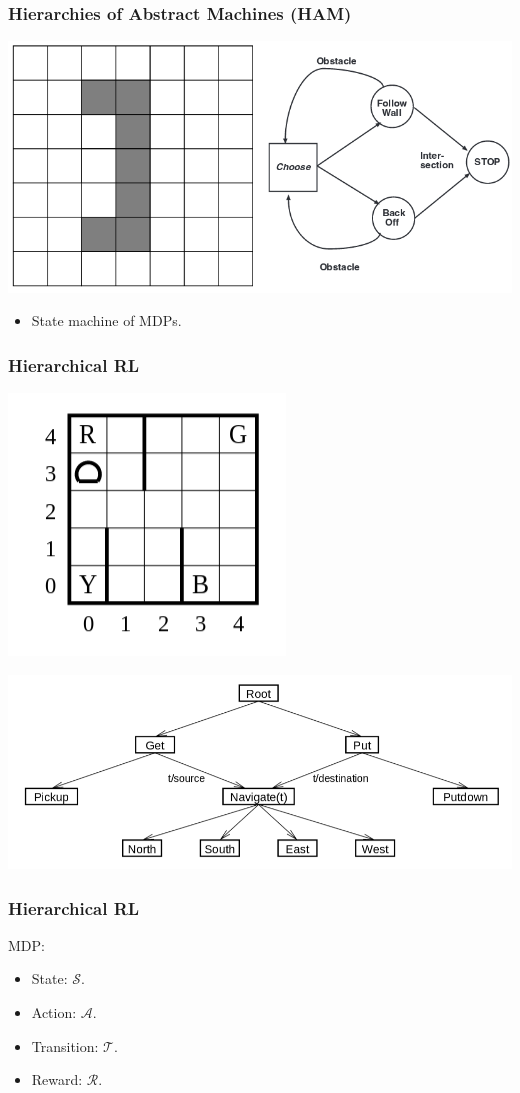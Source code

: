 \documentclass{beamer}
\begin{document}
\begin{frame}
\frametitle{Hierarchies of Abstract Machines (HAM)}
\includegraphics[width=0.8\columnwidth]{ham.png}
\begin{itemize}
  \item State machine of MDPs.
\end{itemize}
\end{frame}

\begin{frame}
\frametitle{Hierarchical RL}
\includegraphics[width=0.4\columnwidth]{taxi.png}

\includegraphics[width=0.8\columnwidth]{maxq.png}
\end{frame}

\begin{frame}
\frametitle{Hierarchical RL}
MDP:
\begin{itemize}
  \item State: {\color{red}$\mathcal{S}$}.
  \item Action: {\color{red}$\mathcal{A}$}.
  \item Transition: {\color{red}$\mathcal{T}$}.
  \item Reward: {\color{red}$\mathcal{R}$}.
\end{itemize}
\end{frame}
\end{document}
